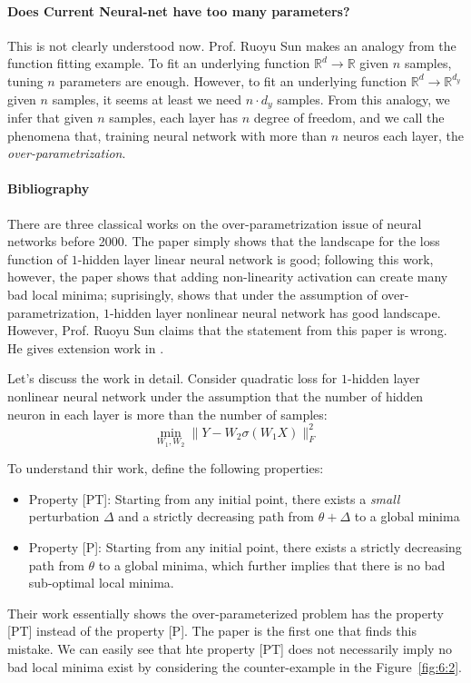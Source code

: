 \paragraph{Does Current Neural-net have too many parameters?}
This is not clearly understood now.
Prof. Ruoyu Sun makes an analogy from the function fitting example.
To fit an underlying function $\mathbb{R}^d\to\mathbb{R}$ given $n$ samples, tuning $n$ parameters are enough.
However, to fit an underlying function $\mathbb{R}^d\to\mathbb{R}^{d_y}$ given $n$ samples, it seems at least we need $n\cdot d_{y}$ samples.
From this analogy, we infer that given $n$ samples, each layer has $n$ degree of freedom, and we call the phenomena that, training neural network with more than $n$ neuros each layer, the \emph{over-parametrization}.

\paragraph{Bibliography}
There are three classical works on the over-parametrization issue of neural networks before 2000.
The paper \citep{BALDI198953} simply shows that the landscape for the loss function of $1$-hidden layer linear neural network is good;
following this work, however, the paper \citep{NIPS19951028} shows that adding non-linearity activation can create many bad local minima;
suprisingly, \citep{410380} shows that under the assumption of over-parametrization, $1$-hidden layer nonlinear neural network has good landscape. However, Prof. Ruoyu Sun claims that the statement from this paper is wrong. He gives extension work in \citep{ruoyusun2018}.

Let's discuss the work \citep{410380} in detail. Consider quadratic loss for $1$-hidden layer nonlinear neural network under the assumption that the number of hidden neuron in each layer is more than the number of samples:
\[
\min_{W_1,W_2}\|Y - W_2\sigma(W_1X)\|_F^2
\]

To understand thir work, define the following properties:
\begin{itemize}
\item
Property [PT]: Starting from any initial point, there exists a \emph{small} perturbation $\Delta$ and a strictly decreasing path from $\theta+\Delta$ to a global minima
\item
Property [P]: Starting from any initial point, there exists a strictly decreasing path from $\theta$ to a global minima, which further implies that there is no bad sub-optimal local minima.
\end{itemize}
Their work essentially shows the over-parameterized problem has the property [PT] instead of the property [P]. The paper \citep{ruoyusun2018} is the first one that finds this mistake.
We can easily see that hte property [PT] does not necessarily imply no bad local minima exist by considering the counter-example in the Figure~\ref{fig:6:2}.

